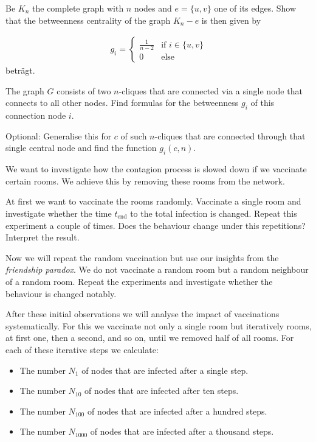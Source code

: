Be $K_n$ the complete graph with $n$ nodes and $e=\{u,v\}$ one of its edges. Show that the betweenness centrality of the graph  $K_n - e$ is then given by
		
\begin{align}
g_i = \begin{cases} \frac{1}{n-2} &\mbox{if } i \in \{u,v\} \\ 
0 & \mbox{else } \end{cases} 
\end{align} 
betr\"agt.

\subexercise[%
  topic= Betweenness Centrality of two connected $n$-Cliques,
    ]


The graph $G$ consists of two $n$-cliques that are connected via a single node that connects to all other nodes. Find formulas for the betweenness $g_i$ of this connection node $i$.

Optional: Generalise this for $c$ of such $n$-cliques that are connected through that single central node and find the function  $g_i(c,n)$.

%
		
\exercise[%
  topic =  Contagion Dynamic -- Vaccination
    ]

We want to investigate how the contagion process is slowed down if we vaccinate certain rooms. We achieve this by removing these rooms from the network.

\subexercise[%
  topic= Random Vaccination,
    ]
\label{impfung}


At first we want to vaccinate the rooms randomly. Vaccinate a single
room and investigate whether the time $t_{\mathrm{end}}$ to the total
infection is changed. Repeat this experiment a couple of times. Does the
behaviour change under this repetitions? Interpret the result.


\subexercise[%
  topic= Random Next Neighbour Vaccination,
    ]

Now we will repeat the random vaccination but use our insights from the
\emph{friendship paradox}. We do not vaccinate a random room but a
random neighbour of a random room. Repeat the experiments and
investigate whether the behaviour is changed notably.

\subexercise[%
  topic= Systematic Investigation of the Vaccination Success,
    ]

After these initial observations we will analyse the impact of vaccinations systematically. For this we vaccinate not only a single room but iteratively rooms, at first one, then a second, and so on, until we removed half of all rooms. For each of these iterative steps we calculate:
\begin{itemize}
\item The number $N_{1}$ of nodes that are infected after a single step.
\item The number $N_{10}$ of nodes that are infected after ten steps.
\item The number $N_{100}$ of nodes that are infected after a hundred steps.
\item The number $N_{1000}$ of nodes that are infected after a thousand steps.
\end{itemize}


